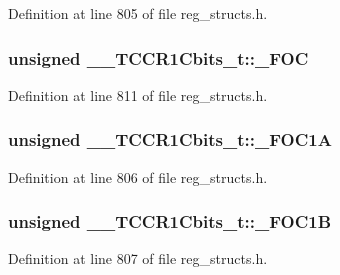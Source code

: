 Definition at line 805 of file reg\+\_\+structs.\+h.

\hypertarget{union_____t_c_c_r1_cbits__t_a4567080ffc7b866aa6ed8149aa3ca782}{
\subsubsection[{\+\_\+\+F\+O\+C}]{\setlength{\rightskip}{0pt plus 5cm}unsigned \+\_\+\+\_\+\+T\+C\+C\+R1\+Cbits\+\_\+t\+::\+\_\+\+F\+O\+C}}\label{union_____t_c_c_r1_cbits__t_a4567080ffc7b866aa6ed8149aa3ca782}


Definition at line 811 of file reg\+\_\+structs.\+h.

\hypertarget{union_____t_c_c_r1_cbits__t_a5027ef60c8818b6d112135c182349aed}{
\subsubsection[{\+\_\+\+F\+O\+C1\+A}]{\setlength{\rightskip}{0pt plus 5cm}unsigned \+\_\+\+\_\+\+T\+C\+C\+R1\+Cbits\+\_\+t\+::\+\_\+\+F\+O\+C1\+A}}\label{union_____t_c_c_r1_cbits__t_a5027ef60c8818b6d112135c182349aed}


Definition at line 806 of file reg\+\_\+structs.\+h.

\hypertarget{union_____t_c_c_r1_cbits__t_a47c4a50d0ecb8263300cb0490ba0604f}{
\subsubsection[{\+\_\+\+F\+O\+C1\+B}]{\setlength{\rightskip}{0pt plus 5cm}unsigned \+\_\+\+\_\+\+T\+C\+C\+R1\+Cbits\+\_\+t\+::\+\_\+\+F\+O\+C1\+B}}\label{union_____t_c_c_r1_cbits__t_a47c4a50d0ecb8263300cb0490ba0604f}


Definition at line 807 of file reg\+\_\+structs.\+h.

